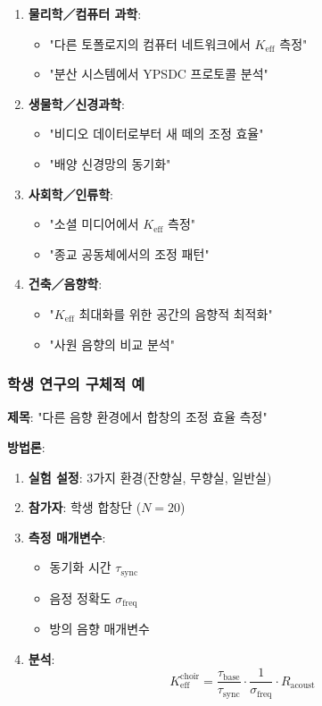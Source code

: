 \documentclass[12pt,a4paper]{article}
\begin{document}
	\begin{enumerate}
		\item \textbf{물리학／컴퓨터 과학}:
		\begin{itemize}
			\item "다른 토폴로지의 컴퓨터 네트워크에서 \(K_{\mathrm{eff}}\) 측정"
			\item "분산 시스템에서 YPSDC 프로토콜 분석"
		\end{itemize}
		
		\item \textbf{생물학／신경과학}:
		\begin{itemize}
			\item "비디오 데이터로부터 새 떼의 조정 효율"
			\item "배양 신경망의 동기화"
		\end{itemize}
		
		\item \textbf{사회학／인류학}:
		\begin{itemize}
			\item "소셜 미디어에서 \(K_{\mathrm{eff}}\) 측정"
			\item "종교 공동체에서의 조정 패턴"
		\end{itemize}
		
		\item \textbf{건축／음향학}:
		\begin{itemize}
			\item "\(K_{\mathrm{eff}}\) 최대화를 위한 공간의 음향적 최적화"
			\item "사원 음향의 비교 분석"
		\end{itemize}
	\end{enumerate}
	
	\subsubsection{학생 연구의 구체적 예}
	
	\textbf{제목}: "다른 음향 환경에서 합창의 조정 효율 측정"
	
	\textbf{방법론}:
	\begin{enumerate}
		\item \textbf{실험 설정}: 3가지 환경(잔향실, 무향실, 일반실)
		\item \textbf{참가자}: 학생 합창단 ($N=20$)
		\item \textbf{측정 매개변수}:
		\begin{itemize}
			\item 동기화 시간 $\tau_{\mathrm{sync}}$
			\item 음정 정확도 $\sigma_{\mathrm{freq}}$
			\item 방의 음향 매개변수
		\end{itemize}
		\item \textbf{분석}:
		\[
		K_{\mathrm{eff}}^{\mathrm{choir}} = \frac{\tau_{\mathrm{base}}}{\tau_{\mathrm{sync}}} \cdot \frac{1}{\sigma_{\mathrm{freq}}} \cdot R_{\mathrm{acoust}}
		\]
	\end{enumerate}
	
\end{document}
